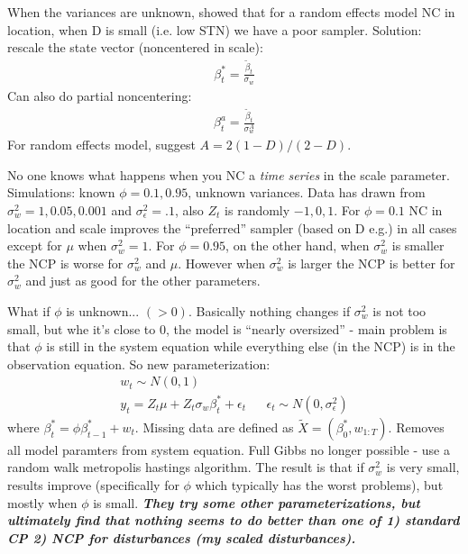 \documentclass{article}\usepackage[]{graphicx}\usepackage[]{color}
\begin{document}
When the variances are unknown, \citet{meng1998fast} showed that for a random effects model NC in location, when D is small (i.e. low STN) we have a poor sampler. Solution: rescale the state vector (noncentered in scale):
\begin{align*}
  \beta_t^* = \frac{\tilde{\beta}_t}{\sigma_w}
\end{align*}
Can also do partial noncentering:
\begin{align*}
  \beta_t^a = \frac{\tilde{\beta}_t}{\sigma_w^A}
\end{align*}
For random effects model, \citet{meng1998fast} suggest $A=2(1-D)/(2-D)$.

No one knows what happens when you NC a {\it time series} in the scale parameter. Simulations: known $\phi=0.1,0.95$, unknown variances. Data has drawn from $\sigma_w^2=1,0.05,0.001$ and $\sigma_\epsilon^2=.1$, also $Z_t$ is randomly $-1,0,1$. For $\phi=0.1$ NC in location and scale improves the ``preferred'' sampler (based on D e.g.) in all cases except for $\mu$ when $\sigma_w^2=1$. For $\phi=0.95$, on the other hand, when $\sigma_w^2$ is smaller the NCP is worse for $\sigma^2_w$ and $\mu$. However when $\sigma^2_w$ is larger the NCP is better for $\sigma^2_w$ and just as good for the other parameters.

What if $\phi$ is unknown... $(>0)$. Basically nothing changes if $\sigma^2_w$ is not too small, but whe it's close to 0, the model is ``nearly oversized'' - main problem is that $\phi$ is still in the system equation while everything else (in the NCP) is in the observation equation. So new parameterization:
\begin{align*}
  w_t\sim N(0,1) && \\
  y_t = Z_t \mu + Z_t\sigma_w\beta_t^* + \epsilon_t && \epsilon_t \sim N(0,\sigma^2_\epsilon)
\end{align*}
where $\beta_t^* = \phi\beta_{t-1}^* + w_t$. Missing data are defined as $\tilde{X}=(\beta_0^*,w_{1:T})$. Removes all model paramters from system equation. Full Gibbs no longer possible - use a random walk metropolis hastings algorithm. The result is that if $\sigma_w^2$ is very small, results improve (specifically for $\phi$ which typically has the worst problems), but mostly when $\phi$ is small. {\it\bf They try some other parameterizations, but ultimately find that nothing seems to do better than one of 1) standard CP 2) NCP for disturbances (my scaled disturbances).}
\end{document}
